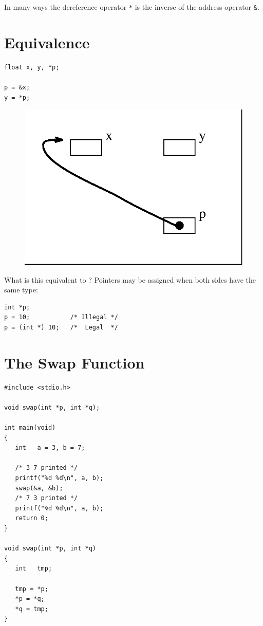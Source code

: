 \documentclass[a4,portraitt]{slides}
\begin{document}
In many ways the dereference operator \verb^*^ is
the inverse of the address operator \verb^&^.

\newpage
\section*{Equivalence}
\begin{verbatim}
float x, y, *p;

p = &x;
y = *p;
\end{verbatim}
\begin{center}
\begin{figure}[h]
\centerline{
\includegraphics{../Figs/point8_6.eps}
}
\end{figure}
\end{center}
What is this equivalent to ?
\newpage
Pointers may be assigned when both sides have the same type:
\begin{verbatim}
int *p;
p = 10;           /* Illegal */
p = (int *) 10;   /*  Legal  */
\end{verbatim}


\newpage
\section*{The Swap Function}
{\small
\begin{verbatim}
#include <stdio.h>

void swap(int *p, int *q);

int main(void)
{
   int   a = 3, b = 7;

   /* 3 7 printed */
   printf("%d %d\n", a, b);
   swap(&a, &b);
   /* 7 3 printed */
   printf("%d %d\n", a, b);
   return 0;
}

void swap(int *p, int *q)
{
   int   tmp;

   tmp = *p;
   *p = *q;
   *q = tmp;
}
\end{verbatim}
}
\end{document}
